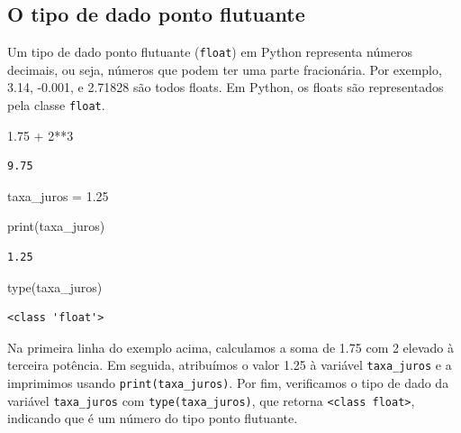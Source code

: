 \documentclass[
  portuguese,
  letterpaper,
  DIV=11,
  numbers=noendperiod]{scrreprt}
\newenvironment{Shaded}{\begin{snugshade}}{\end{snugshade}}
\newcommand{\BuiltInTok}[1]{\textcolor[rgb]{0.00,0.23,0.31}{#1}}
\newcommand{\DecValTok}[1]{\textcolor[rgb]{0.68,0.00,0.00}{#1}}
\newcommand{\FloatTok}[1]{\textcolor[rgb]{0.68,0.00,0.00}{#1}}
\newcommand{\NormalTok}[1]{\textcolor[rgb]{0.00,0.23,0.31}{#1}}
\newcommand{\OperatorTok}[1]{\textcolor[rgb]{0.37,0.37,0.37}{#1}}
\theoremstyle{definition}
\theoremstyle{remark}
\begin{document}
\subsection{O tipo de dado ponto
flutuante}\label{o-tipo-de-dado-ponto-flutuante}

Um tipo de dado ponto flutuante (\texttt{float}) em Python representa
números decimais, ou seja, números que podem ter uma parte fracionária.
Por exemplo, 3.14, -0.001, e 2.71828 são todos floats. Em Python, os
floats são representados pela classe \texttt{float}.

\begin{Shaded}
\begin{Highlighting}[]
\FloatTok{1.75} \OperatorTok{+} \DecValTok{2}\OperatorTok{**}\DecValTok{3} 
\end{Highlighting}
\end{Shaded}

\begin{verbatim}
9.75
\end{verbatim}

\begin{Shaded}
\begin{Highlighting}[]
\NormalTok{taxa\_juros }\OperatorTok{=} \FloatTok{1.25}

\BuiltInTok{print}\NormalTok{(taxa\_juros)}
\end{Highlighting}
\end{Shaded}

\begin{verbatim}
1.25
\end{verbatim}

\begin{Shaded}
\begin{Highlighting}[]
\BuiltInTok{type}\NormalTok{(taxa\_juros)}
\end{Highlighting}
\end{Shaded}

\begin{verbatim}
<class 'float'>
\end{verbatim}

Na primeira linha do exemplo acima, calculamos a soma de 1.75 com 2
elevado à terceira potência. Em seguida, atribuímos o valor 1.25 à
variável \texttt{taxa\_juros} e a imprimimos usando
\texttt{print(taxa\_juros)}. Por fim, verificamos o tipo de dado da
variável \texttt{taxa\_juros} com \texttt{type(taxa\_juros)}, que
retorna
\texttt{\textless{}class\ \textquotesingle{}float\textquotesingle{}\textgreater{}},
indicando que é um número do tipo ponto flutuante.
\end{document}

